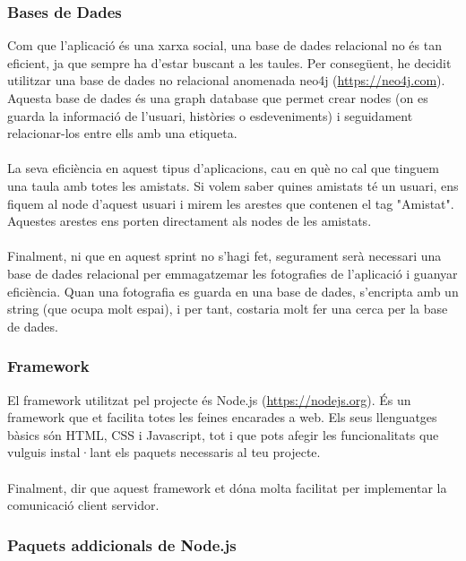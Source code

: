 \documentclass[11pt,catalan,listoffigures,listoftables]{tfgetsinf}
\begin{document}
\subsubsection{Bases de Dades}

Com que l'aplicació és una xarxa social, una base de dades relacional no és tan eficient, ja que sempre ha d'estar buscant a les taules. Per consegüent, he decidit utilitzar una base de dades no relacional anomenada neo4j (\url{https://neo4j.com}). Aquesta base de dades és una graph database que permet crear nodes (on es guarda la informació de l'usuari, històries o esdeveniments) i seguidament relacionar-los entre ells amb una etiqueta. \\ \\
La seva eficiència en aquest tipus d'aplicacions, cau en què no cal que tinguem una taula amb totes les amistats. Si volem saber quines amistats té un usuari, ens fiquem al node d'aquest usuari i mirem les arestes que contenen el tag "Amistat". Aquestes arestes ens porten directament als nodes de les amistats.\\ \\
Finalment, ni que en aquest sprint no s'hagi fet, segurament serà necessari una base de dades relacional per emmagatzemar les fotografies de l'aplicació i guanyar eficiència. Quan una fotografia es guarda en una base de dades, s'encripta amb un string (que ocupa molt espai), i per tant, costaria molt fer una cerca per la base de dades.

\subsubsection{Framework}

El framework utilitzat pel projecte és Node.js (\url{https://nodejs.org}). És un framework que et facilita totes les feines encarades a web. Els seus llenguatges bàsics són HTML, CSS i Javascript, tot i que pots afegir les funcionalitats que vulguis instal·lant els paquets necessaris al teu projecte.\\ \\
Finalment, dir que aquest framework et dóna molta facilitat per implementar la comunicació client servidor.

\subsubsection{Paquets addicionals de Node.js}
\end{document}
